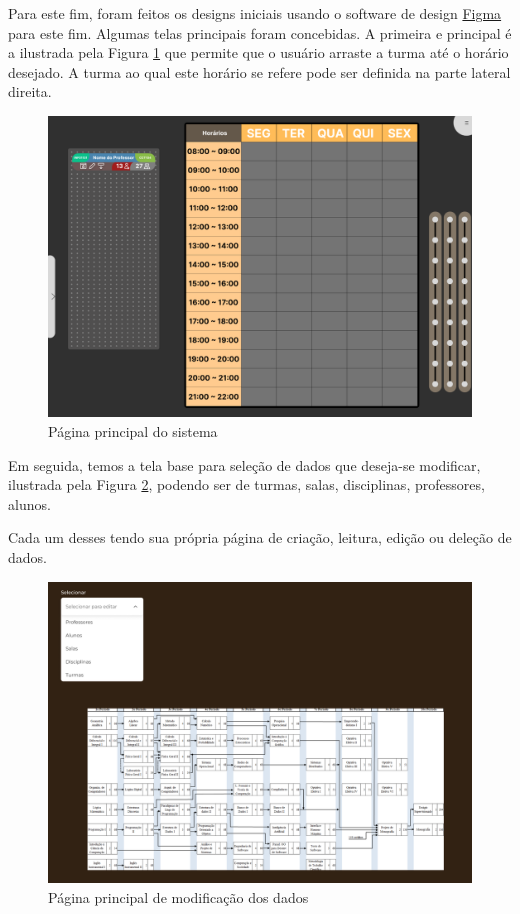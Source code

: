 Para este fim, foram feitos os designs iniciais usando o software de design \href{https://www.figma.com/}{Figma} para este fim. Algumas telas principais foram concebidas. A primeira e principal é a ilustrada pela Figura \ref{fig:main} que permite que o usuário arraste a turma até o horário desejado. A turma ao qual este horário se refere pode ser definida na parte lateral direita.

\begin{figure}[htbp]\centering
  \caption{\label{fig:main} Página principal do sistema}
  \includegraphics[scale=0.6]{files/img/Prototipo/Medio/main.png}
\end{figure} %

Em seguida, temos a tela base para seleção de dados que deseja-se modificar, ilustrada pela Figura \ref{fig:CRUD_main}, podendo ser de turmas, salas, disciplinas, professores, alunos.

Cada um desses tendo sua própria página de criação, leitura, edição ou deleção de dados.

\begin{figure}[htbp]\centering
  \caption{\label{fig:CRUD_main} Página principal de modificação dos dados}
  \includegraphics[scale=0.6]{files/img/Prototipo/Medio/CRUD_main.png}
\end{figure} %

